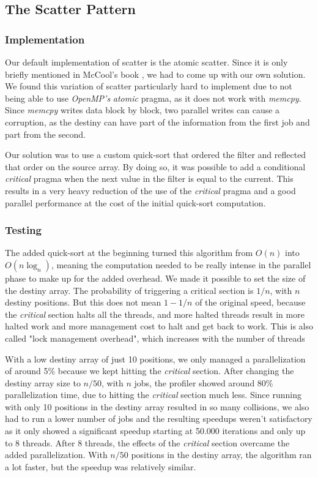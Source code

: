 \documentclass[10pt,journal]{IEEEtran}
\begin{document}
\subsection{The Scatter Pattern}
\label{scatter}

\subsubsection{Implementation}

Our default implementation of scatter is the atomic scatter. Since it is only briefly mentioned in McCool's book \cite{mccool}, we had to come up with our own solution. We found this variation of scatter particularly hard to implement due to not being able to use \textit{OpenMP's} \textit{atomic} pragma, as it does not work with \textit{memcpy}. Since \textit{memcpy} writes data block by block, two parallel writes can cause a corruption, as the destiny can have part of the information from the first job and part from the second.

Our solution was to use a custom quick-sort that ordered the filter and reflected that order on the source array. By doing so, it was possible to add a conditional \textit{critical} pragma when the next value in the filter is equal to the current. This results in a very heavy reduction of the use of the \textit{critical} pragma and a good parallel performance at the cost of the initial quick-sort computation.

\subsubsection{Testing}

The added quick-sort at the beginning turned this algorithm from $ O(n) $ into $ O(n\log_n) $, meaning the computation needed to be really intense in the parallel phase to make up for the added overhead. We made it possible to set the size of the destiny array. The probability of triggering a critical section is $ 1 / n $, with $ n $ destiny positions. But this does not mean $ 1 - 1 / n $ of the original speed, because the \textit{critical} section halts all the threads, and more halted threads result in more halted work and more management cost to halt and get back to work.  This is also called "lock management overhead", which increases with the number of threads \cite{lockmanage} 

With a low destiny array of just 10 positions, we only managed a parallelization of around 5\% because we kept hitting the \textit{critical} section. After changing the destiny array size to $ n / 50 $, with $ n $ jobs, the profiler showed around 80\% parallelization time, due to hitting the \textit{critical} section much less. Since running with only 10 positions in the destiny array resulted in so many collisions, we also had to run a lower number of jobs and the resulting speedups weren't satisfactory as it only showed a significant speedup starting at 50.000 iterations and only up to 8 threads. After 8 threads, the effects of the \textit{critical} section overcame the added parallelization. With $ n / 50 $ positions in the destiny array, the algorithm ran a lot faster, but the speedup was relatively similar. 
\end{document}
